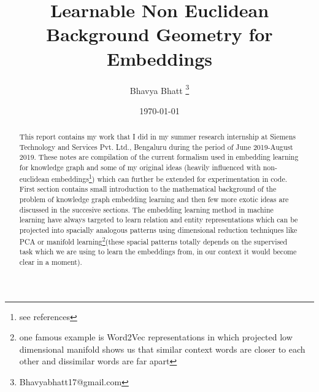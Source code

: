 \documentclass[12pt]{article}
\title{Learnable Non Euclidean Background Geometry for Embeddings}
\author[1]{Bhavya Bhatt \thanks{Bhavyabhatt17@gmail.com}}
\affil[1]{Indian Institute of Technology Mandi, Mandi 175005, India}
\date{\today}
\begin{document}
\maketitle

\begin{abstract}
This report contains my work that I did in my summer research internship at Siemens Technology and Services Pvt. Ltd., Bengaluru during the period of June 2019-August 2019. These notes are compilation of the current formalism used in embedding learning for knowledge graph and some of my original ideas (heavily influenced with non-euclidean embeddings\footnote{see references}) which can further be extended for experimentation in code. First section contains small introduction to the mathematical background of the problem of knowledge graph embedding learning and then few more exotic ideas are discussed in the succesive sections. The embedding learning method in machine learning have always targeted to learn relation and entity representations which can be projected into spacially analogous patterns using dimensional reduction techniques like PCA or manifold learning\footnote{one famous example is Word2Vec representations in which projected low dimensional manifold shows us that similar context words are closer to each other and dissimilar words are far apart}(these spacial patterns totally depends on the supervised task which we are using to learn the embeddings from, in our context it would become clear in a moment).
\end{abstract}

\newpage

\tableofcontents
\newpage
\end{document}
